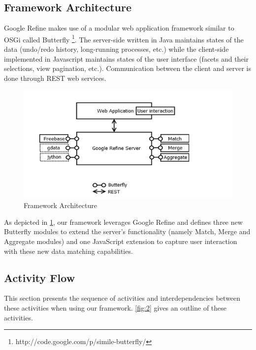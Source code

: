 \documentclass{sig-alternate}
\begin{document}

\subsection{Framework Architecture}
Google Refine makes use of a modular web application framework similar to OSGi called Butterfly \footnote{http://code.google.com/p/simile-butterfly/}. The server-side written in Java maintains states of the data (undo/redo history, long-running processes, etc.) while the client-side implemented in Javascript maintains states of the user interface (facets and their selections, view pagination, etc.). Communication between the client and server is done through REST web services.

\begin{figure}[ht!]
  \centering
    \includegraphics[scale=0.6]{architecture-1.png}
  \caption{Framework Architecture}
  \label{fig:1}
\end{figure}

As depicted in \ref{fig:1}, our framework leverages Google Refine and defines three new Butterfly modules to extend the server's functionality (namely Match, Merge and Aggregate modules) and one JavaScript extension to capture user interaction with these new data matching capabilities.

\subsection{Activity Flow}
This section presents the sequence of activities and interdependencies between these activities when using our framework. \ref{fig:2} gives an outline of these activities.
\end{document}
